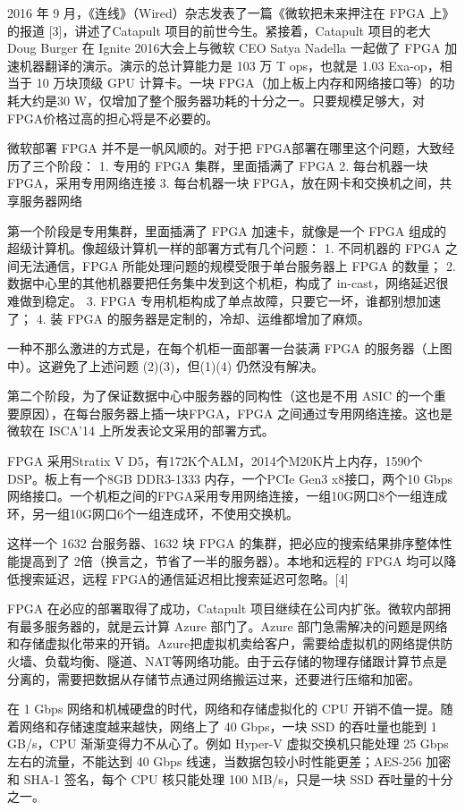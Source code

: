 2016 年 9 月，《连线》（Wired）杂志发表了一篇《微软把未来押注在 FPGA 上》的报道 [3]，讲述了Catapult 项目的前世今生。紧接着，Catapult 项目的老大 Doug Burger 在 Ignite 2016大会上与微软 CEO Satya Nadella 一起做了 FPGA 加速机器翻译的演示。演示的总计算能力是 103 万 T ops，也就是 1.03 Exa-op，相当于 10 万块顶级 GPU 计算卡。一块 FPGA（加上板上内存和网络接口等）的功耗大约是30 W，仅增加了整个服务器功耗的十分之一。只要规模足够大，对FPGA价格过高的担心将是不必要的。

微软部署 FPGA 并不是一帆风顺的。对于把 FPGA部署在哪里这个问题，大致经历了三个阶段：
1.	专用的 FPGA 集群，里面插满了 FPGA
2.	每台机器一块 FPGA，采用专用网络连接
3.	每台机器一块 FPGA，放在网卡和交换机之间，共享服务器网络

第一个阶段是专用集群，里面插满了 FPGA 加速卡，就像是一个 FPGA 组成的超级计算机。像超级计算机一样的部署方式有几个问题：
1.	不同机器的 FPGA 之间无法通信，FPGA 所能处理问题的规模受限于单台服务器上 FPGA 的数量；
2.	数据中心里的其他机器要把任务集中发到这个机柜，构成了 in-cast，网络延迟很难做到稳定。
3.	FPGA 专用机柜构成了单点故障，只要它一坏，谁都别想加速了；
4.	装 FPGA 的服务器是定制的，冷却、运维都增加了麻烦。

一种不那么激进的方式是，在每个机柜一面部署一台装满 FPGA 的服务器（上图中）。这避免了上述问题 (2)(3)，但(1)(4) 仍然没有解决。

第二个阶段，为了保证数据中心中服务器的同构性（这也是不用 ASIC 的一个重要原因），在每台服务器上插一块FPGA，FPGA 之间通过专用网络连接。这也是微软在 ISCA’14 上所发表论文采用的部署方式。

FPGA 采用Stratix V D5，有172K个ALM，2014个M20K片上内存，1590个 DSP。板上有一个8GB DDR3-1333 内存，一个PCIe Gen3 x8接口，两个10 Gbps网络接口。一个机柜之间的FPGA采用专用网络连接，一组10G网口8个一组连成环，另一组10G网口6个一组连成环，不使用交换机。

这样一个 1632 台服务器、1632 块 FPGA 的集群，把必应的搜索结果排序整体性能提高到了 2倍（换言之，节省了一半的服务器）。本地和远程的 FPGA 均可以降低搜索延迟，远程 FPGA的通信延迟相比搜索延迟可忽略。[4]

FPGA 在必应的部署取得了成功，Catapult 项目继续在公司内扩张。微软内部拥有最多服务器的，就是云计算 Azure 部门了。Azure 部门急需解决的问题是网络和存储虚拟化带来的开销。Azure把虚拟机卖给客户，需要给虚拟机的网络提供防火墙、负载均衡、隧道、NAT等网络功能。由于云存储的物理存储跟计算节点是分离的，需要把数据从存储节点通过网络搬运过来，还要进行压缩和加密。

在 1 Gbps 网络和机械硬盘的时代，网络和存储虚拟化的 CPU 开销不值一提。随着网络和存储速度越来越快，网络上了 40 Gbps，一块 SSD 的吞吐量也能到 1 GB/s，CPU 渐渐变得力不从心了。例如 Hyper-V 虚拟交换机只能处理 25 Gbps 左右的流量，不能达到 40 Gbps 线速，当数据包较小时性能更差；AES-256 加密和 SHA-1 签名，每个 CPU 核只能处理 100 MB/s，只是一块 SSD 吞吐量的十分之一。

